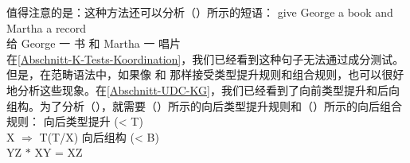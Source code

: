 \begin{exe}
\begin{xlist}[iv.]
\begin{exe}
\begin{xlist}[iv.]
值得注意的是：这种方法还可以分析（）所示的短语：
\ea
\label{Beispiel-Gapping-Steedman}
\gll give George a book and Martha a record\\
     给 George 一 书 和 Martha 一 唱片\\
\z
在\ref{Abschnitt-K-Tests-Koordination}，我们已经看到这种句子无法通过成分测试。但是，在范畴语法中，如果像 \citet{Dowty88a-u}和 \citet{Steedman91a}那样接受类型提升规则和组合规则，也可以很好地分析这些现象。在\ref{Abschnitt-UDC-KG}，我们已经看到了向前类型提升和后向组构。为了分析（），就需要（）所示的向后类型提升规则和（）所示的向后组合规则：
\ea
向后类型提升 (< T)\\
X $\Rightarrow$ T\bs (T/X)
\z
\ea
向后组构 (< B)\\
    Y\bs Z $*$ X\bs Y = X\bs Z
\z


\end{xlist}
\end{exe}
\end{xlist}
\end{exe}
